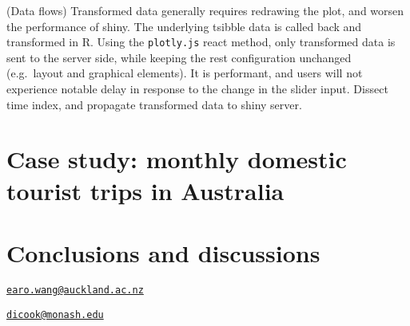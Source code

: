 (Data flows) Transformed data generally requires redrawing the plot, and
worsen the performance of shiny. The underlying tsibble data is called
back and transformed in R. Using the \texttt{plotly.js} react method,
only transformed data is sent to the server side, while keeping the rest
configuration unchanged (e.g.~layout and graphical elements). It is
performant, and users will not experience notable delay in response to
the change in the slider input. Dissect time index, and propagate
transformed data to shiny server.

\hypertarget{case-study-monthly-domestic-tourist-trips-in-australia}{%
\section{Case study: monthly domestic tourist trips in
Australia}\label{case-study-monthly-domestic-tourist-trips-in-australia}}

\hypertarget{conclusions-and-discussions}{%
\section{Conclusions and
discussions}\label{conclusions-and-discussions}}



\address{%
Earo Wang\\
The Univeristy of Auckland\\
Department of Statistics\\ The Univeristy of Auckland\\ New Zealand\\
}
\href{mailto:earo.wang@auckland.ac.nz}{\nolinkurl{earo.wang@auckland.ac.nz}}

\address{%
Dianne Cook\\
Monash Univerisity\\
Department of Econometrics and Business Statistics\\ Monash University\\ Australia\\
}
\href{mailto:dicook@monash.edu}{\nolinkurl{dicook@monash.edu}}

